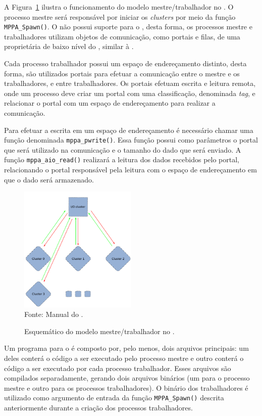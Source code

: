 A Figura~\ref{fig:MPPAIPCTutorial} ilustra o funcionamento do modelo mestre/trabalhador
no \mppa. O processo mestre será responsável por iniciar os
\textit{clusters} por meio da função \texttt{MPPA\_Spawn()}.
O \mppa não possui suporte para o \mpi, desta forma, os processos mestre e
trabalhadores utilizam objetos de comunicação, como portais e filas, de
uma \api proprietária de baixo nível do \mppa, similar à \posix \ipc.

Cada processo trabalhador possui um espaço de endereçamento distinto, desta forma,
são utilizados portais para efetuar a comunicação entre o mestre e os
trabalhadores, e entre trabalhadores. Os
portais efetuam escrita e leitura remota, onde um processo deve criar um portal
com uma classificação, denominada \textit{tag}, e relacionar o portal com um
espaço de endereçamento para realizar a comunicação.

Para efetuar a escrita em um espaço de endereçamento é necessário chamar uma
função denominada \texttt{mppa\_pwrite()}. Essa função possui como parâmetros o
portal que será utilizado na comunicação e o tamanho do dado que será enviado.
A função \texttt{mppa\_aio\_read()} realizará a leitura dos dados recebidos pelo
portal, relacionando o portal responsável pela leitura com o espaço de
endereçamento em que o dado será armazenado.

\begin{figure}
	\centering
	\caption{Esquemático do modelo mestre/trabalhador no \mppa.}
	\includegraphics[width=0.5\textwidth]{figs/MPPAIPCTutorial.pdf} \\
    Fonte: Manual do \mppa.
	\label{fig:MPPAIPCTutorial}
\end{figure}

Um programa para o \mppa é composto por, pelo menos, dois arquivos principais:
um deles conterá o código a ser executado pelo processo mestre e outro conterá o código
a ser executado por cada processo trabalhador. Esses arquivos são compilados separadamente,
gerando dois arquivos binários (um para o processo mestre e outro para os
processos trabalhadores).
O binário dos trabalhadores é utilizado como argumento de entrada da função \texttt{MPPA\_Spawn()}
descrita anteriormente durante a criação dos processos trabalhadores.

